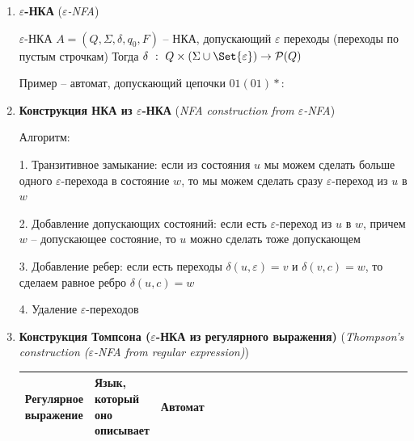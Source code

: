 \documentclass[12pt]{article}
\begin{document}
\begin{enumerate}
        \item \textbf{$\varepsilon$-НКА} (\textit{$\varepsilon$-NFA})

        $\varepsilon$-НКА $A = (Q, \Sigma, \delta, q_0, F)$ -- НКА, допускающий $\varepsilon$ переходы (переходы по пустым строчкам)
        Тогда $\delta \ : \ Q \times (\Sigma \union \Set{\varepsilon}) \to \mathcal{P}(Q)$

        Пример -- автомат, допускающий цепочки $01(01)*$:


        \item \textbf{Конструкция НКА из $\varepsilon$-НКА} (\textit{NFA construction from $\varepsilon$-NFA})

        Алгоритм:

        1. Транзитивное замыкание: если из состояния $u$ мы можем сделать больше одного $\varepsilon$-перехода в состояние $w$, то мы можем сделать сразу $\varepsilon$-переход из $u$ в $w$

        2. Добавление допускающих состояний: если есть $\varepsilon$-переход из $u$ в $w$, причем $w$ -- допускающее состояние, то $u$ можно сделать тоже допускающем

        3. Добавление ребер: если есть переходы $\delta(u, \varepsilon) = v$ и $\delta(v, c) = w$, то сделаем равное ребро $\delta(u, c) = w$

        4. Удаление $\varepsilon$-переходов

        \item \textbf{Конструкция Томпсона ($\varepsilon$-НКА из регулярного выражения)} (\textit{Thompson’s construction ($\varepsilon$-NFA from regular expression)})


        \begin{tabular}{m{0.12\linewidth}|m{0.12\linewidth}|m{0.76\linewidth}}
            Регулярное выражение & Язык, который оно описывает & Автомат \\
            \hline


\end{tabular}
\end{enumerate}
\end{document}
